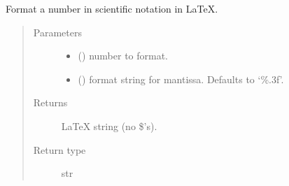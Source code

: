 \documentclass[letterpaper,10pt,english]{sphinxmanual}
\begin{document}
\begin{fulllineitems}
\label{\detokenize{analysis:scdc.plot.latex_exp_format}}
Format a number in scientific notation in LaTeX.
\begin{quote}\begin{description}
\item[{Parameters}] \leavevmode\begin{itemize}
\item {} 
 () \textendash{} number to format.

\item {} 
 (\sphinxstyleliteralemphasis{\sphinxupquote{, }}) \textendash{} format string for mantissa. Defaults to ‘\%.3f’.

\end{itemize}

\item[{Returns}] \leavevmode
LaTeX string (no \$’s).

\item[{Return type}] \leavevmode
str

\end{description}\end{quote}

\end{fulllineitems}

\end{document}

